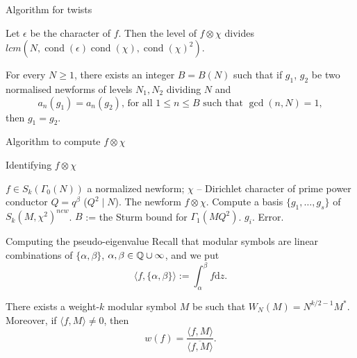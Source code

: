 \documentclass[handout]{beamer}
\DeclareMathOperator{\cond}{cond}
\begin{document}
\begin{frame}{Algorithm for twists}

\begin{Lemma}
Let $\epsilon$ be the character of $f$. Then the level of $f \otimes \chi$ divides $lcm(N, \cond(\epsilon) \cond(\chi), \cond(\chi)^2)$. 
\end{Lemma}

\begin{Lemma}
For every $N \geq 1$, there exists an integer $B = B(N)$ such that if $g_1$, $g_2$ be two normalised newforms of levels $N_1,N_2$ dividing $N$ and 
\[
	a_n(g_1) = a_n(g_2), \, \mbox{for all }1 \leq n \leq B \mbox{ such that } \gcd(n,N) = 1,
\]
then $g_1 = g_2$.
\end{Lemma}

\end{frame}

\begin{frame}{Algorithm to compute $f \otimes \chi$}
\begin{algorithm}[H]
\caption{Identifying  $f \otimes \chi$}
\label{alg: twist}
\begin{algorithmic}
    \Require $f \in S_k(\Gamma_0(N))$ a normalized newform; 
     $\chi$ -- Dirichlet character of prime power conductor $Q = q^\beta$ ($Q^2 \mid N$). 
    \Ensure The newform $f \otimes \chi$. 
	\State Compute a basis $\{g_1, \ldots, g_s\}$ of $S_k(M, \chi^2)^{new}$. 
    	\State $B$ := the Sturm bound for $\Gamma_1(MQ^2)$. 
			\State \Return $g_i$.
		\EndIf
	\EndFor
   \EndFor
   \State \Return Error.
\end{algorithmic}
\end{algorithm}
\end{frame}

\begin{frame}{Computing the pseudo-eigenvalue}
Recall that modular symbols are linear combinations of $\{\alpha, \beta\}$, $\alpha, \beta \in \mathbb{Q} \cup \infty$, 
and we put 
\[
	\langle f, \{\alpha, \beta\} \rangle := \int_{\alpha}^{\beta} f \textrm{d} z. 
\]
\begin{Lemma}
There exists a weight-$k$ modular symbol $M$ be such that $W_N(M) = N^{k/2 -1} M^*$. Moreover, if $\langle f, M \rangle \neq 0$, then 
\[
	w(f) = \frac{\langle f,M \rangle }{\overline{\langle f,M \rangle}}.
\]
\end{Lemma} 

\end{frame}
\end{document}

